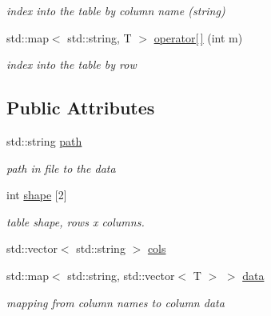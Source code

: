 \begin{DoxyCompactItemize}
\begin{DoxyCompactList}\small\item\em index into the table by column name (string) \end{DoxyCompactList}\item 
std\+::map$<$ std\+::string, T $>$ \hyperlink{classh5wrap_1_1_homogenous_type_table_a777f6bdc03111b5a7d8fde59e184e26c}{operator\mbox{[}$\,$\mbox{]}} (int m)\hypertarget{classh5wrap_1_1_homogenous_type_table_a777f6bdc03111b5a7d8fde59e184e26c}{}\label{classh5wrap_1_1_homogenous_type_table_a777f6bdc03111b5a7d8fde59e184e26c}

\begin{DoxyCompactList}\small\item\em index into the table by row \end{DoxyCompactList}\end{DoxyCompactItemize}
\subsection*{Public Attributes}
\begin{DoxyCompactItemize}
\item 
std\+::string \hyperlink{classh5wrap_1_1_homogenous_type_table_a6da460e4b94719f9ff5fe0d17e8859d7}{path}\hypertarget{classh5wrap_1_1_homogenous_type_table_a6da460e4b94719f9ff5fe0d17e8859d7}{}\label{classh5wrap_1_1_homogenous_type_table_a6da460e4b94719f9ff5fe0d17e8859d7}

\begin{DoxyCompactList}\small\item\em path in file to the data \end{DoxyCompactList}\item 
int \hyperlink{classh5wrap_1_1_homogenous_type_table_ab0e03ddbee134e775ea6fa389897fc8b}{shape} \mbox{[}2\mbox{]}\hypertarget{classh5wrap_1_1_homogenous_type_table_ab0e03ddbee134e775ea6fa389897fc8b}{}\label{classh5wrap_1_1_homogenous_type_table_ab0e03ddbee134e775ea6fa389897fc8b}

\begin{DoxyCompactList}\small\item\em table shape, rows x columns. \end{DoxyCompactList}\item 
std\+::vector$<$ std\+::string $>$ \hyperlink{classh5wrap_1_1_homogenous_type_table_a8b60fa54475f44bea26caab0137d8507}{cols}
\item 
std\+::map$<$ std\+::string, std\+::vector$<$ T $>$ $>$ \hyperlink{classh5wrap_1_1_homogenous_type_table_a06c1889b5469abf303923b17b78a381b}{data}\hypertarget{classh5wrap_1_1_homogenous_type_table_a06c1889b5469abf303923b17b78a381b}{}\label{classh5wrap_1_1_homogenous_type_table_a06c1889b5469abf303923b17b78a381b}

\begin{DoxyCompactList}\small\item\em mapping from column names to column data \end{DoxyCompactList}\end{DoxyCompactItemize}


